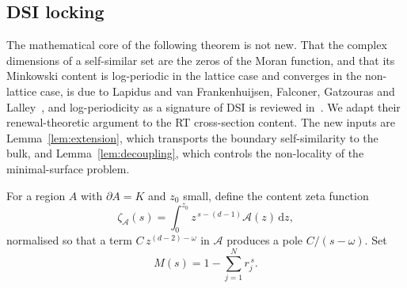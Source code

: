 \documentclass[11pt]{article}
\theoremstyle{definition}\newtheorem{definition}{Definition}[section]
\theoremstyle{remark}\newtheorem*{remark}{Remark}
\newcommand{\cA}{\mathcal{A}}
\newcommand{\dd}{\mathrm{d}}
\begin{document}
\subsection{DSI locking}
The mathematical core of the following theorem is not new. That the complex dimensions of a self-similar
set are the zeros of the Moran function, and that its Minkowski content is log-periodic in the lattice case
and converges in the non-lattice case, is due to Lapidus and van Frankenhuijsen, Falconer, Gatzouras and
Lalley~\cite{LvF,FalconerMink,Gatzouras,Lalley,LvFsurvey}, and log-periodicity as a signature of DSI is
reviewed in~\cite{Sornette}. We adapt their renewal-theoretic argument to the RT cross-section content. The
new inputs are Lemma~\ref{lem:extension}, which transports the boundary self-similarity to the bulk, and
Lemma~\ref{lem:decoupling}, which controls the non-locality of the minimal-surface problem.

For a region $A$ with $\partial A=K$ and $z_0$ small, define the content zeta function
\begin{equation}
\zeta_{\cA}(s)=\int_0^{z_0}z^{\,s-(d-1)}\cA(z)\,\dd z,
\label{eq:zetaA}
\end{equation}
normalised so that a term $C\,z^{(d-2)-\omega}$ in $\cA$ produces a pole $C/(s-\omega)$. Set
\begin{equation}
M(s)=1-\sum_{j=1}^Nr_j^{\,s}.
\end{equation}
\end{document}
